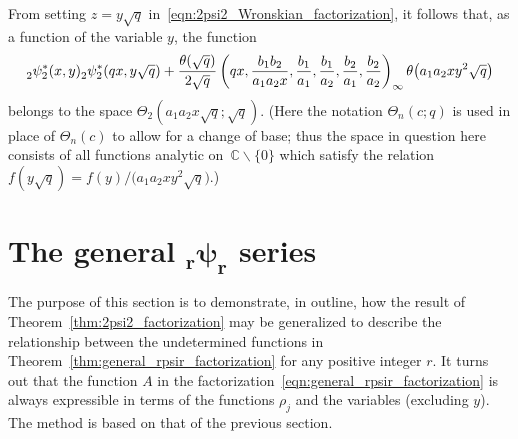 \documentclass[10pt,a4paper]{amsart}
\numberwithin{equation}{section}
\newcommand{\C}{\mathbb{C}}
\begin{document}
\begin{Remark}
From setting $z=y\sqrt{q}$ in~\eqref{eqn:2psi2_Wronskian_factorization}, it follows that, as a function of the variable $y$, the function
\[ {}_2^{}\psi_2^\ast(x,y) {}_2^{}\psi_2^\ast(qx,y\sqrt{q}) + {\theta(\sqrt{q}) \over 2\sqrt{q}} \left(qx,{b_1b_2 \over a_1a_2x},{b_1 \over a_1},{b_1 \over a_2},{b_2 \over a_1},{b_2 \over a_2}\right)_{ \infty} \theta\bigl(a_1a_2xy^2\sqrt{q}\bigr) \]
belongs to the space $\Theta_2(a_1a_2x\sqrt{q};\sqrt{q})$. \big(Here the notation $\Theta_n(c;q)$ is used in place of $\Theta_n(c)$ to allow for a change of base; thus the space in question here consists of all functions analytic on~$\C \backslash \{0\}$ which satisfy the relation $f(y\sqrt{q}) = f(y)/\bigl(a_1a_2xy^2\sqrt{q}\bigr)$.\big)
\end{Remark}

\section[The general \_r psi\_r series]{The general $\boldsymbol{_r\psi_r}$ series}

The purpose of this section is to demonstrate, in outline, how the result of Theorem~\ref{thm:2psi2_factorization} may be generalized to describe the relationship between the undetermined functions in Theorem~\ref{thm:general_rpsir_factorization} for any positive integer $r$. It turns out that the function $A$ in the factorization~\eqref{eqn:general_rpsir_factorization} is always expressible in terms of the functions $\rho_j$ and the variables (excluding $y$). The method is based on that of the previous section.
\end{document}
